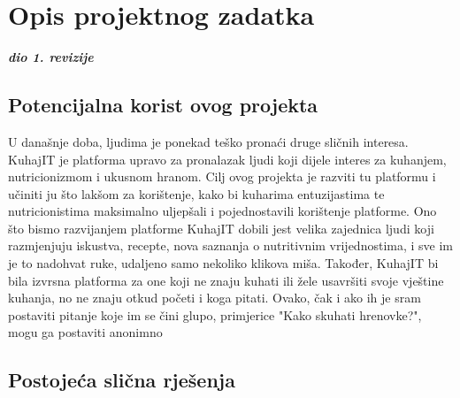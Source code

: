 \chapter{Opis projektnog zadatka}
		
		\textbf{\textit{dio 1. revizije}}\\
		
		\section{Potencijalna korist ovog projekta}

		U današnje doba, ljudima je ponekad teško pronaći druge sličnih interesa. KuhajIT je platforma upravo za pronalazak ljudi koji dijele interes za kuhanjem, nutricionizmom i ukusnom hranom. Cilj ovog projekta je razviti tu platformu i učiniti ju što lakšom za korištenje, kako bi kuharima entuzijastima te nutricionistima maksimalno uljepšali i pojednostavili korištenje platforme. Ono što bismo razvijanjem platforme KuhajIT dobili jest velika zajednica ljudi koji razmjenjuju iskustva, recepte, nova saznanja o nutritivnim vrijednostima, i sve im je to nadohvat ruke, udaljeno samo nekoliko klikova miša. Također, KuhajIT bi bila izvrsna platforma za one koji ne znaju kuhati ili žele usavršiti svoje vještine kuhanja, no ne znaju otkud početi i koga pitati. Ovako, čak i ako ih je sram postaviti pitanje koje im se čini glupo, primjerice "Kako skuhati hrenovke?", mogu ga postaviti anonimno
		
		\section{Postojeća slična rješenja}
		
